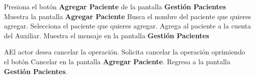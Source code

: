  \begin{UCtrayectoria}
 	
 	\UCpaso [\UCactor] Presiona el botón \textbf{Agregar Paciente} de la pantalla \textbf{Gestión Pacientes}
 	\UCpaso Muestra la pantalla \textbf{Agregar Paciente}
 	\UCpaso [\UCactor] Busca el nombre del paciente que quieres agregar.
 	\UCpaso [\UCactor] Selecciona el paciente que quieres agregar.
 	\UCpaso Agrega al paciente a la cuenta del Auxiliar.
 	\UCpaso Muestra el mensaje  en la pantalla \textbf{Gestión Pacientes} 
 	
 \end{UCtrayectoria}

\begin{UCtrayectoriaA}{A}{El actor desea cancelar la operación.}
	\UCpaso[\UCactor] Solicita cancelar la operación oprimiendo el botón Cancelar en la pantalla \textbf{Agregar Paciente}.
	\UCpaso Regresa a la pantalla \textbf{Gestión Pacientes}.
\end{UCtrayectoriaA}

%

